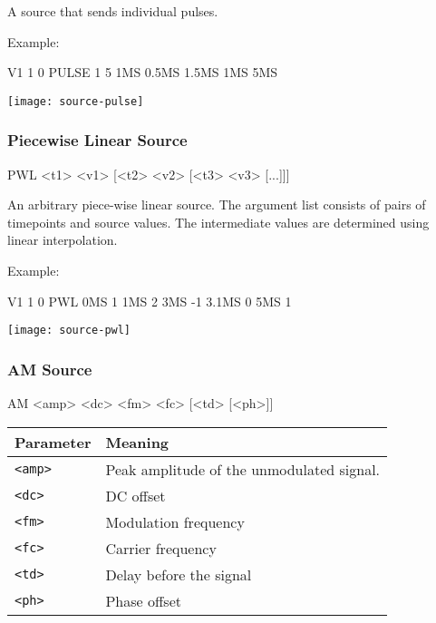 A source that sends individual pulses.

Example:

\begin{code}
V1 1 0 PULSE 1 5 1MS 0.5MS 1.5MS 1MS 5MS
\end{code}

\begin{center}
	\texttt{[image: source-pulse]}
\end{center}

\subsubsection{Piecewise Linear Source}

\begin{code}
PWL <t1> <v1> [<t2> <v2> [<t3> <v3> [...]]]
\end{code}

An arbitrary piece-wise linear source. The argument list consists of pairs of timepoints and source values. The intermediate values are determined using linear interpolation.

Example:
\begin{code}
V1 1 0 PWL 0MS 1 1MS 2 3MS -1 3.1MS 0 5MS 1
\end{code}

\begin{center}
	\texttt{[image: source-pwl]}
\end{center}

\subsubsection{AM Source}
\begin{code}
AM <amp> <dc> <fm> <fc> [<td> [<ph>]]
\end{code}

\begin{center}
	\begin{tabular}{|l|l|}
		\hline
		Parameter & Meaning \\ \hline \hline
		\texttt{<amp>} & Peak amplitude of the unmodulated signal. \\ \hline
		\texttt{<dc>} & DC offset \\ \hline
		\texttt{<fm>} & Modulation frequency \\ \hline
		\texttt{<fc>} & Carrier frequency \\ \hline
		\texttt{<td>} & Delay before the signal \\ \hline
		\texttt{<ph>} & Phase offset \\ \hline
	\end{tabular}
\end{center}

